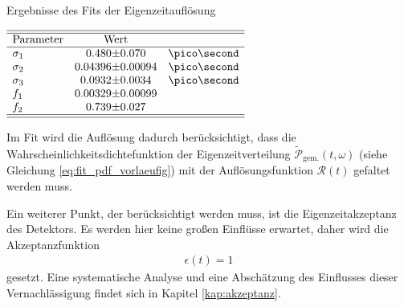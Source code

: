 \begin{table}[hptb]
\centering
\caption{Ergebnisse des Fits der Eigenzeitauflösung}
\label{tab:resolution}
$\begin{array}{l r@{\pm}l l}
\hline 
\hline
\text{Parameter} & \multicolumn{2}{c}{\text{Wert}}&\\
\hline
\sigma_{1} & 0.480 & 0.070 & \ps\\
\sigma_{2} & 0.04396 & 0.00094 & \ps\\
\sigma_{3} & 0.0932 & 0.0034 & \ps\\
f_{1} & 0.00329 & 0.00099\\
f_{2} & 0.739 & 0.027\\ \hline \hline
\end{array}$   
\end{table}

Im Fit wird die Auflösung dadurch berücksichtigt, dass die Wahrscheinlichkeitsdichtefunktion der Eigenzeitverteilung $\widetilde{\mathcal{P}}_{\text{gem.}}(t, \omega)$ (siehe Gleichung \ref{eq:fit_pdf_vorlaeufig}) mit der Auflösungsfunktion $\mathcal{R}(t)$ gefaltet werden muss.

Ein weiterer Punkt, der berücksichtigt werden muss, ist die Eigenzeitakzeptanz des Detektors. Es werden hier keine großen Einflüsse erwartet, daher wird die Akzeptanzfunktion 
\begin{align}
\epsilon(t) = 1
\end{align}
gesetzt. Eine systematische Analyse und eine Abschätzung des Einflusses dieser Vernachlässigung findet sich in Kapitel \ref{kap:akzeptanz}.


